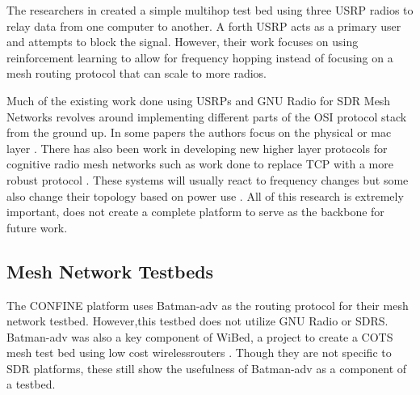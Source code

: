The researchers in \cite{7141228} created a simple multihop test bed using three USRP radios to relay data from one computer to another. A forth USRP acts as a primary user and attempts to block the signal. However, their work focuses on using reinforcement learning to allow for frequency hopping instead of focusing on a mesh routing protocol that can scale to more radios. 

Much of the existing work done using USRPs and GNU Radio for SDR Mesh Networks revolves around implementing different parts of the OSI protocol stack from the ground up. In some papers the authors focus on the physical or mac layer \cite{5508221}. There has also been work in developing new higher layer protocols for cognitive radio mesh networks such as work done to replace TCP with a more robust protocol \cite{6686523}. These systems will usually react to frequency changes but some also change their topology based on power use \cite{6983150}. All of this research is extremely important, does not create a complete platform to serve as the backbone for future work. 

\subsection{Mesh Network Testbeds}

The CONFINE platform uses Batman-adv as the routing protocol for their mesh network testbed. However,this testbed does not utilize GNU Radio or SDRS. \cite{0001} Batman-adv was also a key component of WiBed, a project to create a COTS mesh test bed using low cost wirelessrouters \cite{6686492} \cite{6962154}. Though they are not specific to SDR platforms, these still show the usefulness of Batman-adv as a component of a testbed. 